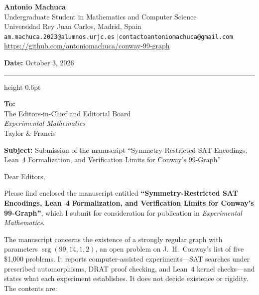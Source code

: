 \documentclass[10pt,a4paper]{article}
\begin{document}
\begin{minipage}[t]{0.72\textwidth}
  {\large\textbf{Antonio Machuca}} \\[1.5pt]
  Undergraduate Student in Mathematics and Computer Science \\
  Universidad Rey Juan Carlos, Madrid, Spain \\[1.5pt]
  {\small\texttt{am.machuca.2023@alumnos.urjc.es} \enspace$|$\enspace \texttt{contactoantoniomachuca@gmail.com}} \\
  \url{https://github.com/antoniomachuca/conway-99-graph}
\end{minipage}
\hfill
\begin{minipage}[t]{0.26\textwidth}
  \raggedleft
  \textbf{Date:} October 3, 2026
\end{minipage}

\vspace{0.4em}
\hrule height 0.6pt
\vspace{0.4em}

\textbf{To:} \\
The Editors-in-Chief and Editorial Board \\
\textit{Experimental Mathematics} \\
Taylor \& Francis

\vspace{0.4em}
\textbf{Subject:} Submission of the manuscript ``Symmetry-Restricted SAT Encodings, Lean~4 Formalization, and Verification Limits for Conway's 99-Graph''
\vspace{0.4em}

Dear Editors,

Please find enclosed the manuscript entitled \textbf{``Symmetry-Restricted SAT Encodings, Lean~4 Formalization, and Verification Limits for Conway's 99-Graph''}, which I submit for consideration for publication in \textit{Experimental Mathematics}.

The manuscript concerns the existence of a strongly regular graph with parameters $\operatorname{srg}(99, 14, 1, 2)$, an open problem on J.~H.~Conway's list of five \$1{,}000 problems. It reports computer-assisted experiments---SAT searches under prescribed automorphisms, DRAT proof checking, and Lean~4 kernel checks---and states what each experiment establishes. It does not decide existence or rigidity. The contents are:
\end{document}
